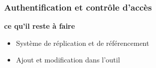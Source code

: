 \begin{frame}
  \frametitle{Authentification et contrôle d'accès}
  \begin{block}{\textbf{ce qu'il reste à faire}}
  \begin{itemize}
  \item Système de réplication et de référencement 
  \item Ajout et modification dans l'outil
  \end{itemize}
  \end{block}
\end{frame}